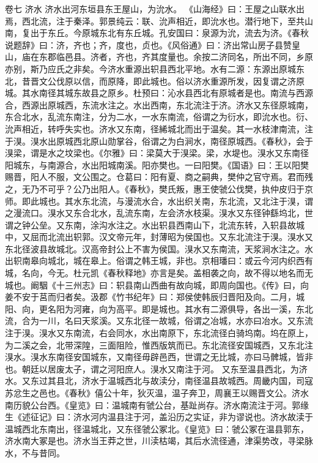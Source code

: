 \documentclass[12pt,UTF8]{ctexbook}
\begin{document}
卷七 济水 
济水出河东垣县东王屋山，为沇水。
《山海经》曰：王屋之山联水出焉，西北流，注于秦泽。郭景纯云：联、沇声相近，即沇水也。潜行地下，至共山南，复出于东丘。今原城东北有东丘城。孔安国曰：泉源为沇，流去为济。《春秋说题辞》曰：济，齐也；齐，度也，贞也。《风俗通》曰：济出常山房子县赞皇山，庙在东郡临邑县。济者，齐也，齐其度量也。余按二济同名，所出不同，乡原亦别，斯乃应氏之非矣。今济水重源出轵县西北平地。水有二源：东源出原城东北，昔晋文公伐原以信，而原降，即此城也。俗以济水重源所发，因复谓之济原城。其水南径其城东故县之原乡。杜预曰：沁水县西北有原城者是也。南流与西源合，西源出原城西，东流水注之。水出西南，东北流注于济。济水又东径原城南，东合北水，乱流东南注，分为二水，一水东南流，俗谓之为衍水，即沇水也。衍、沇声相近，转呼失实也。济水又东南，径絺城北而出于温矣。其一水枝津南流，注于湨。湨水出原城西北原山勋掌谷，俗谓之为白涧水，南径原城西。《春秋》，会于湨梁，谓是水之坟梁也。《尔雅》曰：梁莫大于湨梁。梁，水堤也。湨水又东南径阳城东，与南源合，水出阳城南溪。阳亦樊也。一曰阳樊。《国语》曰：王以阳樊赐晋，阳人不服，文公围之。仓葛曰：阳有夏、商之嗣典，樊仲之官守焉。君而残之，无乃不可乎？公乃出阳人。《春秋》，樊氏叛，惠王使虢公伐樊，执仲皮归于京师。即此城也。其水东北流，与漫流水合，水出织关南，东北流，又北注于湨，谓之漫流口。湨水又东合北水，乱流东南，左会济水枝渠。湨水又东径钟繇坞北，世谓之钟公垒。又东南，涂沟水注之。水出轵县西南山下，北流东转，入轵县故城中，又屈而北流出轵郭。汉文帝元年，封薄昭为侯国也。又东北流注于湨。湨水又东北径波县故城北。汉高帝封公上不害为侯国。湨水又东南流，天浆涧水注之。水出轵南皋向城北，城在皋上。俗谓之韩王城，非也。京相璠曰：或云今河内织西有城，名向，今无。杜元凯《春秋释地》亦言是矣。盖相袭之向，故不得以地名而无城也。阚駰《十三州志》曰：轵县南山西曲有故向城，即周向国也。《传》曰，向姜不安于莒而归者矣。汲郡《竹书纪年》曰：郑侯使韩辰归晋阳及向。二月，城阳、向，更名阳为河雍，向为高平。即是城也。其水有二源俱导，各出一溪，东北流，合为一川，名曰天浆溪。又东北径一故城，俗谓之冶城，水亦曰冶水。又东流注于湨。湨水又东南流，右会同水，水出南原下，东北流径白骑坞南。坞在原上，为二溪之会，北带深隍，三面阻险，惟西版筑而已。东北流径安国城西，又东北注湨水。湨水东南径安国城东，又南径毋辟邑西，世谓之无比城，亦曰马髀城，皆非也。朝廷以居废太子，谓之河阳庶人。湨水又南注于河。
又东至温县西北，为济水。又东过其县北，济水于温城西北与故渎分，南径温县故城西。周畿内国，司寇苏忿生之邑也。《春秋》僖公十年，狄灭温，温子奔卫，周襄王以赐晋文公。济水南历貌公台西。《皇览》曰：温城南有虢公台，基趾尚存。济水南流注于河。郭缘生《述征记》曰：济水河内温县注于河，盖沿历之实证，非为谬说也。济水故渎于温城西北东南出，径温城北，又东径虢公冢北。《皇览》曰：虢公冢在温县郭东，济水南大冢是也。济水当王莽之世，川渎枯竭，其后水流径通，津渠势改，寻梁脉水，不与昔同。
\end{document}
